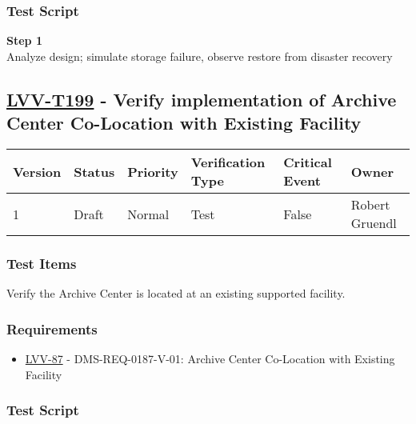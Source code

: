 \subsubsection{Test Script}\label{test-script-57}

\textbf{Step 1}\\
Analyze design; simulate storage failure, observe restore from disaster
recovery\\[2\baselineskip]

\hypertarget{lvv-t199---verify-implementation-of-archive-center-co-location-with-existing-facility}{\subsection{\texorpdfstring{\href{https://jira.lsstcorp.org/secure/Tests.jspa\#/testCase/LVV-T199}{LVV-T199}
- Verify implementation of Archive Center Co-Location with Existing
Facility}{LVV-T199 - Verify implementation of Archive Center Co-Location with Existing Facility}}\label{lvv-t199---verify-implementation-of-archive-center-co-location-with-existing-facility}}

\begin{longtable}[]{@{}llllll@{}}
\toprule
Version & Status & Priority & Verification Type & Critical Event &
Owner\tabularnewline
\midrule
\endhead
1 & Draft & Normal & Test & False & Robert Gruendl\tabularnewline
\bottomrule
\end{longtable}

\subsubsection{Test Items}\label{test-items-58}

Verify the Archive Center is located at an existing supported facility.

\subsubsection{Requirements}\label{requirements-58}

\begin{itemize}
\tightlist
\item
  \href{https://jira.lsstcorp.org/browse/LVV-87}{LVV-87} -
  DMS-REQ-0187-V-01: Archive Center Co-Location with Existing Facility
\end{itemize}

\subsubsection{Test Script}\label{test-script-58}

